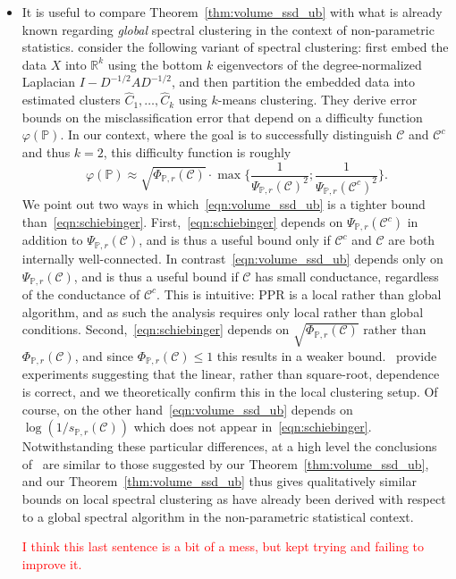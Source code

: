 \documentclass[11pt,twoside]{article}
\newcommand{\Reals}{\mathbb{R}}
\newcommand{\1}{\mathbf{1}}
\newcommand{\mc}[1]{\mathcal{#1}}
\newcommand{\Pbb}{\mathbb{P}}
\newcommand{\wh}[1]{\widehat{#1}}
\begin{document}
\begin{itemize}
	\item It is useful to compare Theorem~\ref{thm:volume_ssd_ub} with what is already known regarding \emph{global} spectral clustering in the context of non-parametric statistics. \citep{schiebinger2015} consider the following variant of spectral clustering: first embed the data $X$ into $\Reals^{k}$ using the bottom $k$ eigenvectors of the degree-normalized Laplacian $I - D^{-1/2}AD^{-1/2}$, and then partition the embedded data into estimated clusters $\wh{C}_1,\ldots,\wh{C}_k$  using $k$-means clustering. They derive error bounds on the misclassification error that depend on a difficulty function $\varphi(\Pbb)$. In our context, where the goal is to successfully distinguish $\mc{C}$ and $\mc{C}^c$ and thus $k = 2$, this difficulty function is roughly
	\begin{equation}
	\label{eqn:schiebinger}
	\varphi(\Pbb) \approx \sqrt{\Phi_{\Pbb,r}(\mc{C})} \cdot \max\biggl\{ \frac{1}{\Psi_{\Pbb,r}(\mc{C})^2}; \frac{1}{\Psi_{\Pbb,r}(\mc{C}^c)^2}\biggr\}.
	\end{equation}
	We point out two ways in which~\eqref{eqn:volume_ssd_ub} is a tighter bound than~\eqref{eqn:schiebinger}. First,~\eqref{eqn:schiebinger} depends on $\Psi_{\Pbb,r}(\mc{C}^c)$ in addition to $\Psi_{\Pbb,r}(\mc{C})$, and is thus a useful bound only if $\mc{C}^c$ and $\mc{C}$ are both internally well-connected. In contrast~\eqref{eqn:volume_ssd_ub} depends only on $\Psi_{\Pbb,r}(\mc{C})$, and is thus a useful bound if $\mc{C}$ has small conductance, regardless of the conductance of $\mc{C}^c$. This is intuitive: PPR is a local rather than global algorithm, and as such the analysis requires only local rather than global conditions. Second,~\eqref{eqn:schiebinger} depends on $\sqrt{\Phi_{\Pbb,r}(\mc{C})}$ rather than $\Phi_{\Pbb,r}(\mc{C})$, and since $\Phi_{\Pbb,r}(\mc{C}) \leq 1$ this results in a weaker bound.~\citep{schiebinger2015} provide experiments suggesting that the linear, rather than square-root, dependence is correct, and we theoretically confirm this in the local clustering setup. Of course, on the other hand~\eqref{eqn:volume_ssd_ub} depends on $\log(1/s_{\Pbb,r}(\mc{C}))$ which does not appear in~\eqref{eqn:schiebinger}. Notwithstanding these particular differences, at a high level the conclusions of~\citep{schiebinger2015} are similar to those suggested by our Theorem~\ref{thm:volume_ssd_ub}, and our Theorem~\ref{thm:volume_ssd_ub} thus gives qualitatively similar bounds on local spectral clustering as have already been derived with respect to a global spectral algorithm in the non-parametric statistical context.
	
	\textcolor{red}{I think this last sentence is a bit of a mess, but kept trying and failing to improve it.}
\end{itemize}
\end{document}
